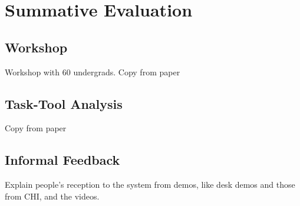 \chapter{Summative Evaluation}

\section{Workshop}

Workshop with 60 undergrads. Copy from paper

\section{Task-Tool Analysis}

Copy from paper

\section{Informal Feedback}

Explain people's reception to the system from demos, like desk demos
and those from CHI, and the videos.
